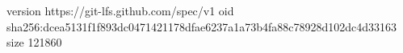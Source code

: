 version https://git-lfs.github.com/spec/v1
oid sha256:dcea5131f1f893dc0471421178dfae6237a1a73b4fa88c78928d102dc4d33163
size 121860
